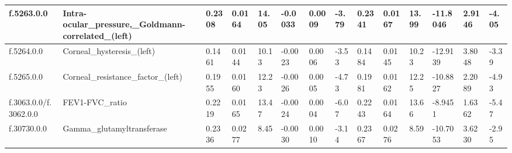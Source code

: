 \begin{longtable}{llllllllllllll}
\multicolumn{1}{|l|}{f.5263.0.0} &
  \multicolumn{1}{l|}{Intra-ocular\_pressure,\_Goldmann-correlated\_(left)} &
  \multicolumn{1}{l|}{0.2308} &
  \multicolumn{1}{l|}{0.0164} &
  \multicolumn{1}{l|}{14.05} &
  \multicolumn{1}{l|}{-0.0033} &
  \multicolumn{1}{l|}{0.0009} &
  \multicolumn{1}{l|}{-3.79} &
  \multicolumn{1}{l|}{0.2341} &
  \multicolumn{1}{l|}{0.0167} &
  \multicolumn{1}{l|}{13.99} &
  \multicolumn{1}{l|}{-11.8046} &
  \multicolumn{1}{l|}{2.9146} &
  \multicolumn{1}{l|}{-4.05} \\ \hline
\multicolumn{1}{|l|}{f.5264.0.0} &
  \multicolumn{1}{l|}{Corneal\_hysteresis\_(left)} &
  \multicolumn{1}{l|}{0.1461} &
  \multicolumn{1}{l|}{0.0144} &
  \multicolumn{1}{l|}{10.13} &
  \multicolumn{1}{l|}{-0.0023} &
  \multicolumn{1}{l|}{0.0006} &
  \multicolumn{1}{l|}{-3.53} &
  \multicolumn{1}{l|}{0.1484} &
  \multicolumn{1}{l|}{0.0145} &
  \multicolumn{1}{l|}{10.23} &
  \multicolumn{1}{l|}{-12.9139} &
  \multicolumn{1}{l|}{3.8048} &
  \multicolumn{1}{l|}{-3.39} \\ \hline
\multicolumn{1}{|l|}{f.5265.0.0} &
  \multicolumn{1}{l|}{Corneal\_resistance\_factor\_(left)} &
  \multicolumn{1}{l|}{0.1955} &
  \multicolumn{1}{l|}{0.0160} &
  \multicolumn{1}{l|}{12.23} &
  \multicolumn{1}{l|}{-0.0026} &
  \multicolumn{1}{l|}{0.0005} &
  \multicolumn{1}{l|}{-4.73} &
  \multicolumn{1}{l|}{0.1981} &
  \multicolumn{1}{l|}{0.0162} &
  \multicolumn{1}{l|}{12.25} &
  \multicolumn{1}{l|}{-10.8827} &
  \multicolumn{1}{l|}{2.2089} &
  \multicolumn{1}{l|}{-4.93} \\ \hline
\multicolumn{1}{|l|}{f.3063.0.0/f.3062.0.0} &
  \multicolumn{1}{l|}{FEV1-FVC\_ratio} &
  \multicolumn{1}{l|}{0.2219} &
  \multicolumn{1}{l|}{0.0165} &
  \multicolumn{1}{l|}{13.47} &
  \multicolumn{1}{l|}{-0.0024} &
  \multicolumn{1}{l|}{0.0004} &
  \multicolumn{1}{l|}{-6.07} &
  \multicolumn{1}{l|}{0.2243} &
  \multicolumn{1}{l|}{0.0164} &
  \multicolumn{1}{l|}{13.66} &
  \multicolumn{1}{l|}{-8.9451} &
  \multicolumn{1}{l|}{1.6362} &
  \multicolumn{1}{l|}{-5.47} \\ \hline
\multicolumn{1}{|l|}{f.30730.0.0} &
  \multicolumn{1}{l|}{Gamma\_glutamyltransferase} &
  \multicolumn{1}{l|}{0.2336} &
  \multicolumn{1}{l|}{0.0277} &
  \multicolumn{1}{l|}{8.45} &
  \multicolumn{1}{l|}{-0.0030} &
  \multicolumn{1}{l|}{0.0010} &
  \multicolumn{1}{l|}{-3.14} &
  \multicolumn{1}{l|}{0.2367} &
  \multicolumn{1}{l|}{0.0276} &
  \multicolumn{1}{l|}{8.59} &
  \multicolumn{1}{l|}{-10.7053} &
  \multicolumn{1}{l|}{3.6230} &
  \multicolumn{1}{l|}{-2.95} \\ \hline

\end{longtable}
